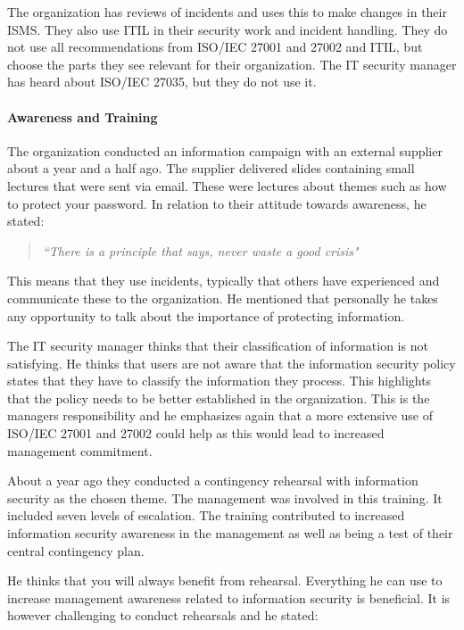 The organization has reviews of incidents and uses this to make changes in their \ac{ISMS}. They also use \ac{ITIL} in their security work and incident handling. They do not use all recommendations from \acs{ISO}/\acs{IEC} 27001 and 27002 and \ac{ITIL}, but choose the parts they see relevant for their organization. The IT security manager has heard about \acs{ISO}/\acs{IEC} 27035, but they do not use it.

\paragraph{Awareness and Training}
The organization conducted an information campaign with an external supplier about a year and a half ago. The supplier delivered slides containing small lectures that were sent via email. These were lectures about themes such as how to protect your password. In relation to their attitude towards awareness, he stated: 

\begin{quote}
\textit{``There is a principle that says, never waste a good crisis"}
\end{quote}

This means that they use incidents, typically that others have experienced and communicate these to the organization. He mentioned that personally he takes any opportunity to talk about the importance of protecting information.

The IT security manager thinks that their classification of information is not satisfying. He thinks that users are not aware that the information security policy states that they have to classify the information they process. This highlights that the policy needs to be better established in the organization. This is the managers responsibility and he emphasizes again that a more extensive use of \acs{ISO}/\acs{IEC} 27001 and 27002 could help as this would lead to increased management commitment.

About a year ago they conducted a contingency rehearsal with information security as the chosen theme. The management was involved in this training. It included seven levels of escalation. The training contributed to increased information security awareness in the management as well as being a test of their central contingency plan.

He thinks that you will always benefit from rehearsal. Everything he can use to increase management awareness related to information security is beneficial. It is however challenging to conduct rehearsals and he stated:

